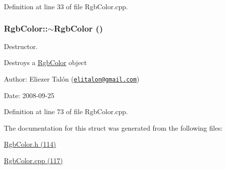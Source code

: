 Definition at line 33 of file RgbColor.cpp.\hypertarget{struct_rgb_color_1d4e0b01edaea01389a3fd3e02ed9f74}{
\subsubsection[$\sim$RgbColor]{\setlength{\rightskip}{0pt plus 5cm}RgbColor::$\sim$RgbColor ()}}
\label{struct_rgb_color_1d4e0b01edaea01389a3fd3e02ed9f74}


Destructor. 

Destroys a \hyperlink{struct_rgb_color}{RgbColor} object

\begin{Desc}
\item[Author:]Eliezer Talón (\href{mailto:elitalon@gmail.com}{\tt elitalon@gmail.com}) \end{Desc}
\begin{Desc}
\item[Date:]2008-09-25 \end{Desc}


Definition at line 73 of file RgbColor.cpp.

The documentation for this struct was generated from the following files:\begin{CompactItemize}
\item 
\hyperlink{_rgb_color_8h}{RgbColor.h (114)}\item 
\hyperlink{_rgb_color_8cpp}{RgbColor.cpp (117)}\end{CompactItemize}
